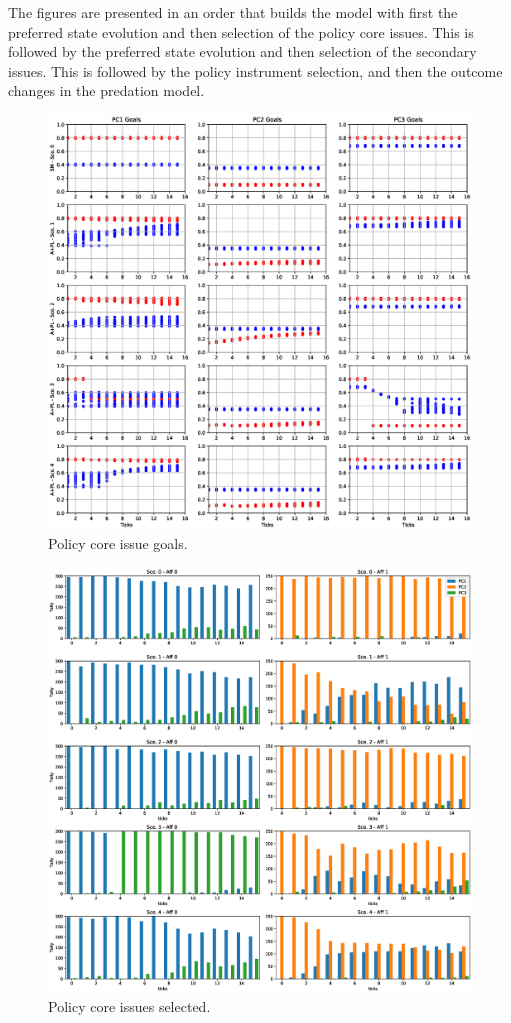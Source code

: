 \documentclass[12pt]{article}
\begin{document}
The figures are presented in an order that builds the model with first the preferred state evolution and then selection of the policy core issues. This is followed by the preferred state evolution and then selection of the secondary issues. This is followed by the policy instrument selection, and then the outcome changes in the predation model.

\begin{figure}
\centering
\includegraphics[width = 0.95\linewidth, angle = 0]{figures/PE_PL_PCGoals_+PL}
\caption{Policy core issue goals.}
\label{fig:PE_PL_PCGoals}
\end{figure}

\begin{figure}
\centering
\includegraphics[width = 0.95\linewidth, angle = 0]{figures/PE_PL_PCSelected_+PL}
\caption{Policy core issues selected.}
\label{fig:PE_PL_PCSelected}
\end{figure}
\end{document}

